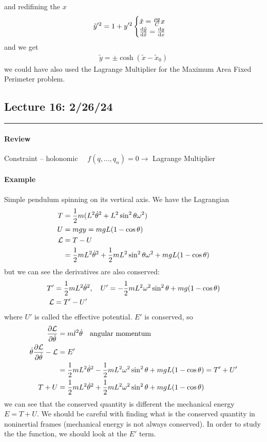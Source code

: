 \documentclass[../main.tex]{subfiles}
\begin{document}
and redifining the $x$
\begin{align*}
    \tilde y'^2 = 1 + y'^2
    \begin{cases}
        \tilde x = \frac{\rho g}{C} x \\
        \dv{\tilde y}{\tilde x} = \dv{y}{x}
    \end{cases}
\end{align*}
and we get
\begin{align*}
    \tilde y = \pm \cosh(\tilde x - \tilde x_0)
\end{align*}
we could have also used the Lagrange Multiplier for the Maximum Area Fixed Perimeter problem.

\newpage
\subsection*{Lecture 16: \hfill 2/26/24}
\hrule \vspace{10px}

\paragraph*{Review} Constraint -- holonomic $\quad f(q,\dots, q_n) = 0 \to$ Lagrange Multiplier
\paragraph*{Example} Simple pendulum spinning on its vertical axis. We have the Lagrangian
\begin{align*}
    T &= \frac{1}{2} m(L^2 \dot\theta^2 + L^2 \sin^2\theta \omega^2) \\
    U &= mgy = mgL(1 - \cos\theta) \\
    \mathcal{L} &= T - U \\
    &= \frac{1}{2} m L^2 \dot \theta^2 + \frac{1}{2} m L^2 \sin^2\theta \omega^2 + mgL(1 - \cos\theta)
\end{align*}
but we can see the derivatives are also conserved:
\begin{align*}
    T' &= \frac{1}{2} m L^2\dot\theta^2, \quad U' = -\frac{1}{2} mL^2 \omega^2 \sin^2\theta + mg(1 - \cos\theta) \\
    \mathcal{L} &= T' - U'
\end{align*}
where $U'$ is called the effective potential. $E'$ is conserved, so
\begin{align*}
    \pdv{\lagr}{\dot\theta} &= ml^2 \dot\theta \qqtext{angular momentum} \\
    \dot\theta\pdv{\lagr}{\dot\theta} - \lagr &= E' \\
    &= \frac{1}{2} mL^2 \dot\theta^2 - \frac{1}{2} mL^2\omega^2 \sin^2\theta + mgL(1 - \cos\theta) = T' + U' \\
    T + U &= \frac{1}{2}mL^2\dot\theta^2 + \frac{1}{2} mL^2\omega^2 \sin^2\theta + mgL(1 - \cos\theta)
\end{align*}
we can see that the conserved quantity is different the mechanical energy $E = T + U$. We should be
careful with finding what is the conserved quantity in noninertial frames (mechanical energy is not
always conserved). In order to study the the function, we should look at the $E'$ term.
\end{document}

